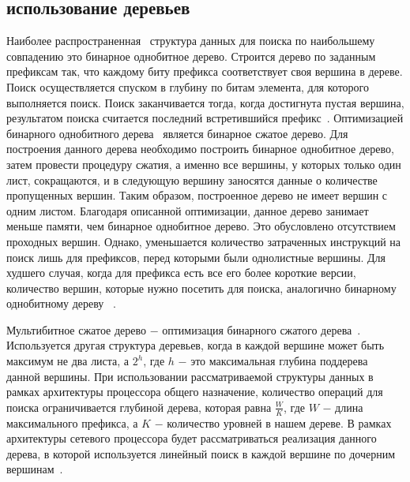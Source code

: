 \documentclass[conference]{IEEEtran}
\begin{document}
    \subsection{использование деревьев}
        \label{section:bctrev}
            Наиболее распространенная~\cite{behdadfar2009scalar} структура данных для поиска по 
            наибольшему совпадению это бинарное однобитное дерево. 
            Строится дерево по заданным префиксам так, что каждому биту префикса соответствует своя вершина в дереве. 
            Поиск осуществляется спуском в глубину по битам элемента, для которого выполняется поиск. 
            Поиск заканчивается тогда, когда достигнута пустая вершина, результатом поиска считается последний встретившийся префикс~\cite{chao2007high:1}.
            Оптимизацией бинарного однобитного дерева~\cite{ruiz2001survey} является бинарное сжатое дерево. 
            Для построения данного дерева необходимо построить бинарное однобитное дерево, 
            затем провести процедуру сжатия, а именно все вершины, у которых только один лист, 
            сокращаются, и в следующую вершину заносятся данные о количестве пропущенных вершин. 
            Таким образом, построенное дерево не имеет вершин с одним листом. 
            Благодаря описанной оптимизации, данное дерево занимает меньше памяти, 
            чем бинарное однобитное дерево. Это обусловлено отсутствием проходных вершин. 
            Однако, уменьшается количество затраченных инструкций на поиск лишь 
            для префиксов, перед которыми были однолистные вершины. Для худшего случая, когда для префикса есть все его более короткие версии, количество вершин, 
            которые нужно посетить для поиска, аналогично бинарному однобитному дереву ~\cite{ruiz2001survey}. 

            Мультибитное сжатое дерево $-$ оптимизация бинарного сжатого дерева~\cite{berger2003ip}.
            Используется другая структура деревьев, когда в каждой вершине может быть максимум не два листа, 
            а {\ttfamily $2^h$}, где {\ttfamily $h$} $-$ это максимальная глубина поддерева данной вершины.
            При использовании рассматриваемой структуры данных в рамках архитектуры процессора общего назначение, 
            количество операций для поиска ограничивается глубиной дерева,
            которая равна {\ttfamily $\frac{W}{K}$}, где {\ttfamily $W$} $-$ длина максимального префикса, 
            а {\ttfamily $K$} $-$ количество уровней в нашем дереве.
            В рамках архитектуры сетевого процессора будет рассматриваться реализация данного дерева, 
            в которой используется линейный поиск в каждой вершине по дочерним вершинам~\cite{berger2003ip}.
                    
\end{document}
